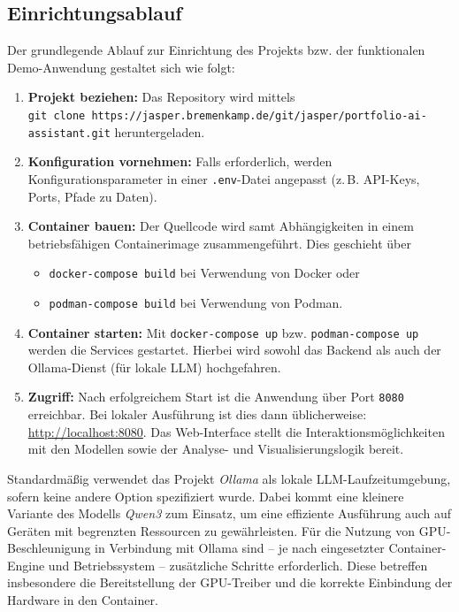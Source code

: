     \subsection{Einrichtungsablauf}

      Der grundlegende Ablauf zur Einrichtung des Projekts bzw. der funktionalen Demo-Anwendung gestaltet sich wie folgt:

      \begin{enumerate}
        \item \textbf{Projekt beziehen:} Das Repository wird mittels \\
        \texttt{git clone https://jasper.bremenkamp.de/git/jasper/portfolio-ai-assistant.git} heruntergeladen.
        \item \textbf{Konfiguration vornehmen:} Falls erforderlich, werden Konfigurationsparameter in einer \texttt{.env}-Datei angepasst (z.\,B. API-Keys, Ports, Pfade zu Daten).
        \item \textbf{Container bauen:} Der Quellcode wird samt Abhängigkeiten in einem betriebsfähigen Containerimage zusammengeführt.
        Dies geschieht über
        \begin{itemize}
          \item \texttt{docker-compose build} bei Verwendung von Docker oder
          \item \texttt{podman-compose build} bei Verwendung von Podman.
        \end{itemize}
        \item \textbf{Container starten:} Mit \texttt{docker-compose up} bzw. \texttt{podman-compose up} werden die Services gestartet.
        Hierbei wird sowohl das Backend als auch der Ollama-Dienst (für lokale \acs{LLM}) hochgefahren.
        \item \textbf{Zugriff:} Nach erfolgreichem Start ist die Anwendung über Port \texttt{8080} erreichbar.
        Bei lokaler Ausführung ist dies dann üblicherweise: \url{http://localhost:8080}.
        Das Web-Interface stellt die Interaktionsmöglichkeiten mit den Modellen sowie der Analyse- und Visualisierungslogik bereit.
      \end{enumerate}

      Standardmäßig verwendet das Projekt \emph{Ollama} als lokale \acs{LLM}-Laufzeitumgebung, sofern keine andere Option spezifiziert wurde.
      Dabei kommt eine kleinere Variante des Modells \emph{Qwen3} zum Einsatz, um eine effiziente Ausführung auch auf Geräten mit begrenzten Ressourcen zu gewährleisten.
      Für die Nutzung von \acs{GPU}-Beschleunigung in Verbindung mit Ollama sind -- je nach eingesetzter Container-Engine und Betriebssystem -- zusätzliche Schritte erforderlich.
      Diese betreffen insbesondere die Bereitstellung der GPU-Treiber und die korrekte Einbindung der Hardware in den Container.


